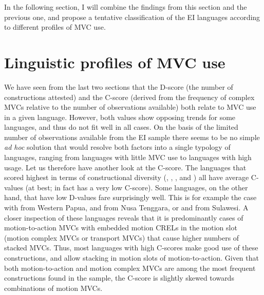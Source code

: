 In the following section, I will combine the findings from this section and the previous one, and propose a tentative classification of the EI languages according to different profiles of MVC use.

\section{Linguistic profiles of MVC use} \label{sec:profile_use}

We have seen from the last two sections that the D-score (the number of constructions attested) and the C-score (derived from the frequency of complex MVCs relative to the number of observations available) both relate to MVC use in a given language. However, both values show opposing trends for some languages, and thus do not fit well in all cases. On the basis of the limited number of observations available from the EI sample there seems to be no simple \textit{ad hoc} solution that would resolve both factors into a single typology of languages, ranging from languages with little MVC use to languages with high usage. Let us therefore have another look at the C-score. The languages that scored highest in terms of constructional diversity (, , , and ) all have average C-values (at best;  in fact has a very low C-score). Some  languages, on the other hand, that have low D-values fare surprisingly well. This is for example the case with  from Western Papua,  and  from Nusa Tenggara, or  and  from Sulawesi. A closer inspection of these languages reveals that it is predominantly cases of motion-to-action MVCs with embedded motion CRELs in the motion slot (motion complex MVCs or transport MVCs) that cause higher numbers of stacked MVCs. Thus, most languages with high C-scores make good use of these constructions, and allow stacking in motion slots of motion-to-action. Given that both motion-to-action and motion complex MVCs are among the most frequent constructions found in the sample, the C-score is slightly skewed towards combinations of motion MVCs.

